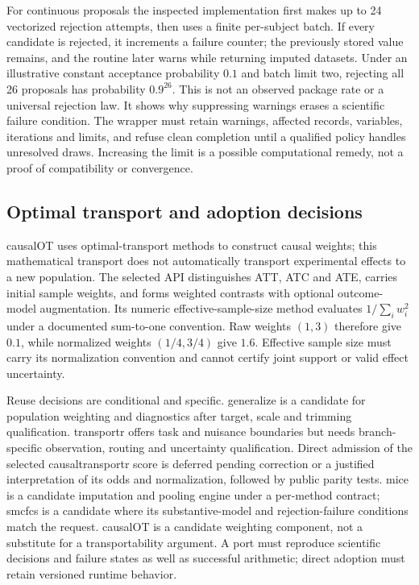 For continuous proposals the inspected implementation first makes up to 24 vectorized rejection attempts, then uses a finite per-subject batch. If every candidate is rejected, it increments a failure counter; the previously stored value remains, and the routine later warns while returning imputed datasets. Under an illustrative constant acceptance probability $0.1$ and batch limit two, rejecting all 26 proposals has probability $0.9^{26}$. This is not an observed package rate or a universal rejection law. It shows why suppressing warnings erases a scientific failure condition. The wrapper must retain warnings, affected records, variables, iterations and limits, and refuse clean completion until a qualified policy handles unresolved draws. Increasing the limit is a possible computational remedy, not a proof of compatibility or convergence.~\citep{exec25_rtm_smcfcs,exec25_rtm_choice}

\subsection{Optimal transport and adoption decisions}

causalOT uses optimal-transport methods to construct causal weights; this mathematical transport does not automatically transport experimental effects to a new population. The selected API distinguishes ATT, ATC and ATE, carries initial sample weights, and forms weighted contrasts with optional outcome-model augmentation. Its numeric effective-sample-size method evaluates $1/\sum_i w_i^2$ under a documented sum-to-one convention. Raw weights $(1,3)$ therefore give $0.1$, while normalized weights $(1/4,3/4)$ give $1.6$. Effective sample size must carry its normalization convention and cannot certify joint support or valid effect uncertainty.~\citep{exec25_rtm_causalOT,exec25_rtm_choice}

Reuse decisions are conditional and specific. generalize is a candidate for population weighting and diagnostics after target, scale and trimming qualification. transportr offers task and nuisance boundaries but needs branch-specific observation, routing and uncertainty qualification. Direct admission of the selected causaltransportr score is deferred pending correction or a justified interpretation of its odds and normalization, followed by public parity tests. mice is a candidate imputation and pooling engine under a per-method contract; smcfcs is a candidate where its substantive-model and rejection-failure conditions match the request. causalOT is a candidate weighting component, not a substitute for a transportability argument. A port must reproduce scientific decisions and failure states as well as successful arithmetic; direct adoption must retain versioned runtime behavior.~\citep{exec25_rtm_choice}

